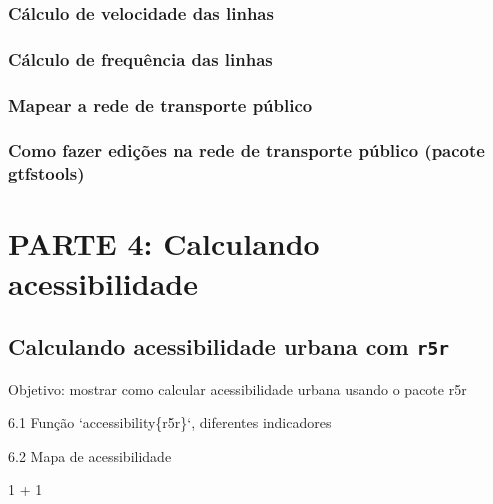 \documentclass[
  letterpaper,
  DIV=11,
  numbers=noendperiod]{scrreprt}
\newenvironment{Shaded}{\begin{snugshade}}{\end{snugshade}}
\newcommand{\DecValTok}[1]{\textcolor[rgb]{0.68,0.00,0.00}{#1}}
\newcommand{\SpecialCharTok}[1]{\textcolor[rgb]{0.37,0.37,0.37}{#1}}
\begin{document}
\hypertarget{cuxe1lculo-de-velocidade-das-linhas}{%
\section{Cálculo de velocidade das
linhas}\label{cuxe1lculo-de-velocidade-das-linhas}}

\hypertarget{cuxe1lculo-de-frequuxeancia-das-linhas}{%
\section{Cálculo de frequência das
linhas}\label{cuxe1lculo-de-frequuxeancia-das-linhas}}

\hypertarget{mapear-a-rede-de-transporte-puxfablico}{%
\section{Mapear a rede de transporte
público}\label{mapear-a-rede-de-transporte-puxfablico}}

\hypertarget{como-fazer-ediuxe7uxf5es-na-rede-de-transporte-puxfablico-pacote-gtfstools}{%
\section{Como fazer edições na rede de transporte público (pacote
gtfstools)}\label{como-fazer-ediuxe7uxf5es-na-rede-de-transporte-puxfablico-pacote-gtfstools}}

\part{PARTE 4: Calculando acessibilidade}

\hypertarget{calculando-acessibilidade-urbana-com-r5r}{%
\chapter{\texorpdfstring{Calculando acessibilidade urbana com
\texttt{r5r}}{Calculando acessibilidade urbana com r5r}}\label{calculando-acessibilidade-urbana-com-r5r}}

Objetivo: mostrar como calcular acessibilidade urbana usando o pacote
r5r

6.1 Função `accessibility\{r5r\}`, diferentes indicadores

6.2 Mapa de acessibilidade

\begin{Shaded}
\begin{Highlighting}[]
\DecValTok{1} \SpecialCharTok{+} \DecValTok{1}
\end{Highlighting}
\end{Shaded}
\end{document}
